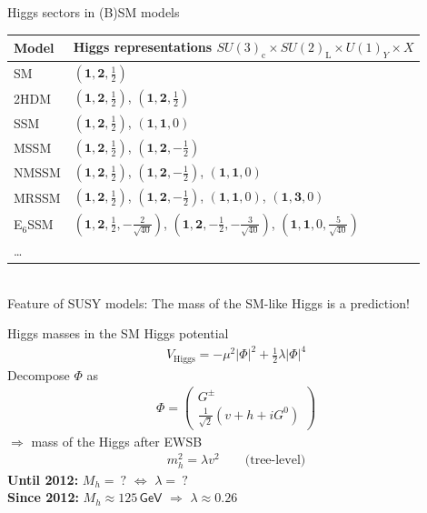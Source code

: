 \documentclass[hyperref={pdfpagelabels=false},ngerman]{beamer}
\newcommand{\eh}[1]{\,\mathsf{#1}}
\renewcommand{\emph}{\textbf}
\newcommand{\UY}{\ensuremath{U(1)_{Y}}}
\newcommand{\SUL}{\ensuremath{SU(2)_\text{L}}}
\newcommand{\SUc}{\ensuremath{SU(3)_\text{c}}}
\begin{document}
\begin{frame}{Higgs sectors in (B)SM models}
  \begin{tabular}{ll}
    \toprule
    Model & Higgs representations $\SUc\times\SUL\times\UY\times X$ \\
    \midrule
    SM    & $(\mathbf{1}, \mathbf{2}, \frac{1}{2})$ \\
    2HDM  & $(\mathbf{1}, \mathbf{2}, \frac{1}{2})$, $(\mathbf{1}, \mathbf{2}, \frac{1}{2})$ \\
    SSM   & $(\mathbf{1}, \mathbf{2}, \frac{1}{2})$, $(\mathbf{1}, \mathbf{1}, 0)$ \\
    MSSM  & $(\mathbf{1}, \mathbf{2}, \frac{1}{2})$, $(\mathbf{1}, \mathbf{2}, -\frac{1}{2})$ \\
    NMSSM & $(\mathbf{1}, \mathbf{2}, \frac{1}{2})$, $(\mathbf{1}, \mathbf{2}, -\frac{1}{2})$, $(\mathbf{1}, \mathbf{1}, 0)$ \\
    MRSSM & $(\mathbf{1}, \mathbf{2}, \frac{1}{2})$, $(\mathbf{1}, \mathbf{2}, -\frac{1}{2})$,
            $(\mathbf{1}, \mathbf{1}, 0)$, $(\mathbf{1}, \mathbf{3}, 0)$ \\
    E$_6$SSM & $(\mathbf{1}, \mathbf{2}, \frac{1}{2}, -\frac{2}{\sqrt{40}})$,
               $(\mathbf{1}, \mathbf{2}, -\frac{1}{2}, -\frac{3}{\sqrt{40}})$,
               $(\mathbf{1}, \mathbf{1}, 0, \frac{5}{\sqrt{40}})$\\
    \ldots \\
    \bottomrule
  \end{tabular}
  \\\vspace{2em} Feature of SUSY models: The mass of the SM-like Higgs
  is a prediction!
\end{frame}

\begin{frame}{Higgs masses in the SM}
  Higgs potential
  \begin{align*}
    V_{\text{Higgs}} = -\mu^2 |\Phi|^2 + \frac{1}{2}\lambda|\Phi|^4
  \end{align*}
  Decompose $\Phi$ as
  \begin{align*}
    \Phi =
    \begin{pmatrix}
      G^\pm \\ \frac{1}{\sqrt{2}} (v + h + i G^0)
    \end{pmatrix}
  \end{align*}
  $\Rightarrow$ mass of the Higgs after EWSB
  \begin{align*}
    m_h^2 = \lambda v^2  \qquad \text{(tree-level)}
  \end{align*}
  \emph{Until 2012:} $M_h =\ ?$ $\Leftrightarrow$ $\lambda =\ ?$\\
  \emph{Since 2012:} $M_h \approx 125\eh{GeV}$ $\Rightarrow$ $\lambda \approx 0.26$
\end{frame}
\end{document}
